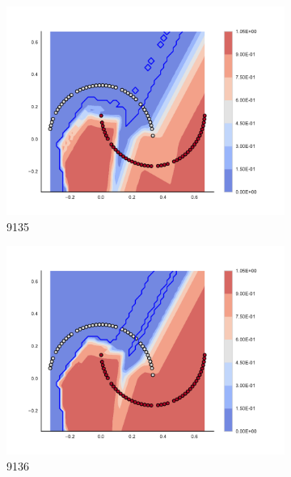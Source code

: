 \begin{figure}[h]
\begin{subfigure}[b]{0.09\textwidth}
    \includegraphics[clip, trim=2.35cm 1.75cm 4.5cm 0cm,width=\textwidth]{img/convergence/9135.pdf}
    \caption{9135}
    \label{fig:convergence_9135}
\end{subfigure}
%
\begin{subfigure}[b]{0.09\textwidth}
    \includegraphics[clip, trim=2.35cm 1.75cm 4.5cm 0cm,width=\textwidth]{img/convergence/9136.pdf}
    \caption{9136}
    \label{fig:convergence_9136}
\end{subfigure}
%
\begin{subfigure}[b]{0.09\textwidth}

\end{subfigure}
\end{figure}
